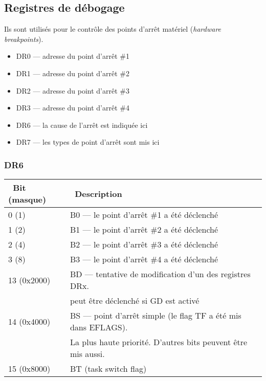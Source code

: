\subsection{Registres de débogage}

Ils sont utilisés pour le contrôle des points d'arrêt matériel (\textit{hardware breakpoints}).

\begin{itemize}
	\item DR0 --- adresse du point d'arrêt \#1
	\item DR1 --- adresse du point d'arrêt \#2
	\item DR2 --- adresse du point d'arrêt \#3
	\item DR3 --- adresse du point d'arrêt \#4
	\item DR6 --- la cause de l'arrêt est indiquée ici
	\item DR7 --- les types de point d'arrêt sont mis ici
\end{itemize}

\subsubsection{DR6}

\begin{center}
\begin{tabular}{ | l | l | }
\hline
\headercolor\ Bit (masque) &
\headercolor\ Description \\
\hline
0 (1)       &  B0 --- le point d'arrêt \#1 a été déclenché \\
\hline
1 (2)       &  B1 --- le point d'arrêt \#2 a été déclenché \\
\hline
2 (4)       &  B2 --- le point d'arrêt \#3 a été déclenché \\
\hline
3 (8)       &  B3 --- le point d'arrêt \#4 a été déclenché \\
\hline
13 (0x2000) &  BD --- tentative de modification d'un des registres DRx.\\
            &  peut être déclenché si GD est activé \\
\hline
14 (0x4000) &  BS --- point d'arrêt simple (le flag TF a été mis dans EFLAGS). \\
	    &  La plus haute priorité. D'autres bits peuvent être mis aussi. \\
\hline
15 (0x8000) &  BT (task switch flag) \\
\hline
\end{tabular}
\end{center}

